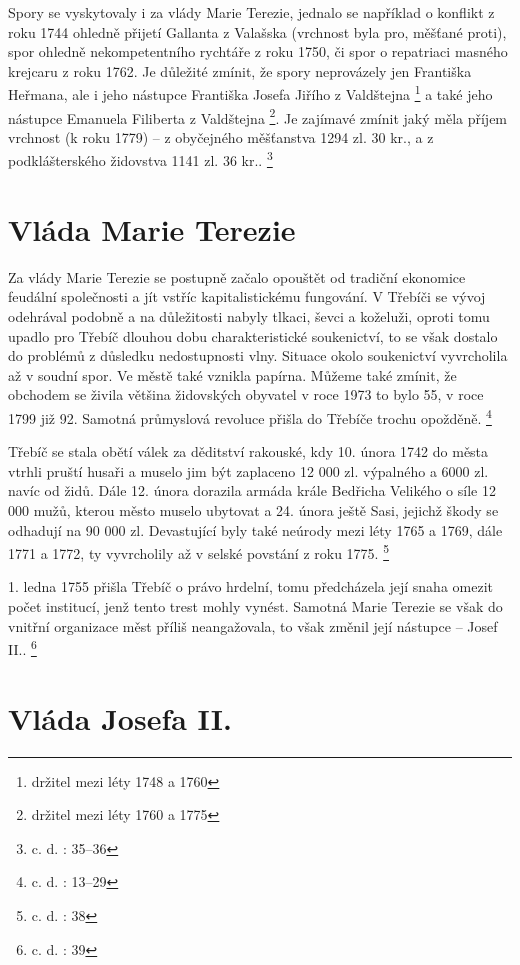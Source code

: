\documentclass[a4paper,oneside,12p]{report}
\begin{document}
Spory se vyskytovaly i za vlády Marie Terezie, jednalo se například o konflikt z roku 1744 ohledně přijetí Gallanta z Valašska (vrchnost byla pro, měšťané proti), spor ohledně nekompetentního rychtáře z roku 1750, či spor o repatriaci masného krejcaru z roku 1762.
Je důležité zmínit, že spory neprovázely jen Františka Heřmana, ale i jeho nástupce Františka Josefa Jiřího z Valdštejna \footnote{držitel mezi léty 1748 a 1760} a také jeho nástupce Emanuela Filiberta z Valdštejna \footnote{držitel mezi léty 1760 a 1775}.
Je zajímavé zmínit jaký měla příjem vrchnost (k roku 1779) -- z obyčejného měšťanstva 1294 zl. 30 kr., a z podklášterského židovstva 1141 zl. 36 kr..
\footnote{c. d. : 35--36}


\section{Vláda Marie Terezie}

Za vlády Marie Terezie se postupně začalo opouštět od tradiční ekonomice feudální společnosti a jít vstříc kapitalistickému fungování.
V Třebíči se vývoj odehrával podobně a na důležitosti nabyly tlkaci, ševci a koželuži, oproti tomu upadlo pro Třebíč dlouhou dobu charakteristické soukenictví, to se však dostalo do problémů z důsledku nedostupnosti vlny.
Situace okolo soukenictví vyvrcholila až v soudní spor.
Ve městě také vznikla papírna.
Můžeme také zmínit, že obchodem se živila většina židovských obyvatel v roce 1973 to bylo 55, v roce 1799 již 92.
Samotná průmyslová revoluce přišla do Třebíče trochu opožděně. \footnote{c. d. : 13--29}

Třebíč se stala obětí válek za děditství rakouské, kdy 10. února 1742 do města vtrhli pruští husaři a muselo jim být zaplaceno 12 000 zl. výpalného a 6000 zl. navíc od židů.
Dále 12. února dorazila armáda  krále Bedřicha Velikého o síle 12 000 mužů, kterou město muselo ubytovat a 24. února ještě Sasi, jejichž škody se odhadují na 90 000 zl.
Devastující byly také neúrody mezi léty 1765 a 1769, dále 1771 a 1772, ty vyvrcholily až v selské povstání z roku 1775. \footnote{c. d. : 38}

1. ledna 1755 přišla Třebíč o právo hrdelní, tomu předcházela její snaha omezit počet institucí, jenž tento trest mohly vynést.
Samotná Marie Terezie se však do vnitřní organizace měst příliš neangažovala, to však změnil její nástupce -- Josef II.. \footnote{c. d. : 39}

\section{Vláda Josefa II.}
\end{document}
